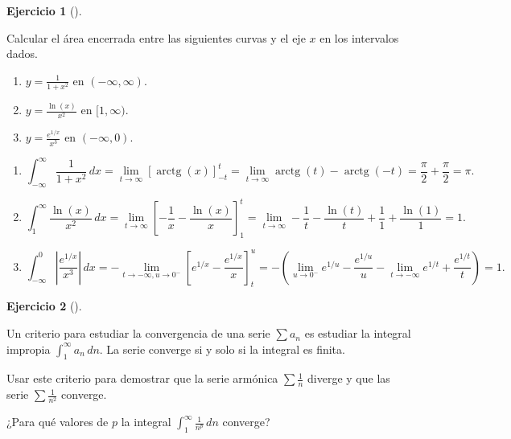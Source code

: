 \documentclass[
  spanish,
  a4paper,
]{scrreport}
\theoremstyle{definition}
\newtheorem{exercise}{Ejercicio}[chapter]
\theoremstyle{remark}
\begin{document}
\begin{exercise}[]\protect\hypertarget{exr-integrales-impropias}{}\label{exr-integrales-impropias}

Calcular el área encerrada entre las siguientes curvas y el eje \(x\) en
los intervalos dados.

\begin{enumerate}
\def\labelenumi{\alph{enumi}.}
\item
  \(y=\frac{1}{1+x^2}\) en \((-\infty,\infty)\).
\item
  \(y = \frac{\ln(x)}{x^2}\) en \([1,\infty)\).
\item
  \(y=\frac{e^{1/x}}{x^3}\) en \((-\infty,0)\).
\end{enumerate}

\end{exercise}

\begin{tcolorbox}[enhanced jigsaw, arc=.35mm, bottomrule=.15mm, bottomtitle=1mm, breakable, colback=white, colbacktitle=quarto-callout-tip-color!10!white, colframe=quarto-callout-tip-color-frame, coltitle=black, left=2mm, leftrule=.75mm, opacityback=0, opacitybacktitle=0.6, rightrule=.15mm, title=\textcolor{quarto-callout-tip-color}{\faLightbulb}\hspace{0.5em}{Solución}, titlerule=0mm, toprule=.15mm, toptitle=1mm]

\begin{enumerate}
\def\labelenumi{\alph{enumi}.}
\item
  \[
   \int_{-\infty}^\infty \frac{1}{1+x^2}\, dx 
   = \lim_{t\to\infty} \left[\operatorname{arctg}(x)\right]_{-t}^{t} 
   = \lim_{t\to\infty} \operatorname{arctg}(t)-\operatorname{arctg}(-t) 
   = \frac{\pi}{2}+\frac{\pi}{2} = \pi.
   \]
\item
  \[
   \int_{1}^\infty \frac{\ln(x)}{x^2}\, dx 
   = \lim_{t\to\infty} \left[-\frac{1}{x}-\frac{\ln(x)}{x}\right]_1^t
   = \lim_{t\to\infty} -\frac{1}{t}-\frac{\ln(t)}{t} + \frac{1}{1}+\frac{\ln(1)}{1} = 1.
   \]
\item
  \[
   \int_{-\infty}^0 \left|\frac{e^{1/x}}{x^3}\right| \, dx 
   = -\lim_{t\to-\infty, u\to 0^-} \left[e^{1/x}-\frac{e^{1/x}}{x}\right]_{t}^{u} 
   = -\left(\lim_{u\to 0^-} e^{1/u}-\frac{e^{1/u}}{u}- \lim_{t\to -\infty}e^{1/t}+\frac{e^{1/t}}{t}\right) = 1.
   \]
\end{enumerate}

\end{tcolorbox}

\begin{exercise}[]\protect\hypertarget{exr-criterio-integral-convergencia-series}{}\label{exr-criterio-integral-convergencia-series}

Un criterio para estudiar la convergencia de una serie \(\sum a_n\) es
estudiar la integral impropia \(\int_1^\infty a_n\,dn\). La serie
converge si y solo si la integral es finita.

Usar este criterio para demostrar que la serie armónica
\(\sum \frac{1}{n}\) diverge y que las serie \(\sum \frac{1}{n^2}\)
converge.

¿Para qué valores de \(p\) la integral
\(\int_1^\infty \frac{1}{n^p}\,dn\) converge?

\end{exercise}
\end{document}
